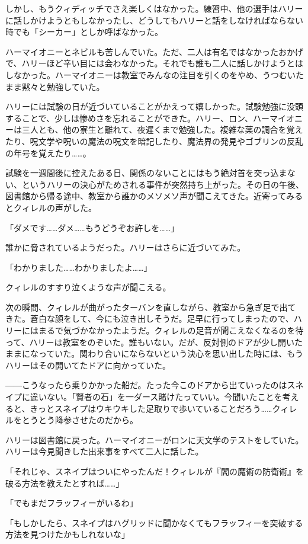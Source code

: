 \documentclass[10pt,a4paper]{article}
\begin{document}
\begin{CJK}{UTF8}{min}
しかし、もうクィディッチでさえ楽しくはなかった。練習中、他の選手はハリーに話しかけようともしなかったし、どうしてもハリーと話をしなければならない時でも「シーカー」としか呼ばなかった。

ハーマイオニーとネビルも苦しんでいた。ただ、二人は有名ではなかったおかげで、ハリーほど辛い目には会わなかった。それでも誰も二人に話しかけようとはしなかった。ハーマイオニーは教室でみんなの注目を引くのをやめ、うつむいたまま黙々と勉強していた。

ハリーには試験の日が近づいていることがかえって嬉しかった。試験勉強に没頭することで、少しは惨めさを忘れることができた。ハリー、ロン、ハーマイオニーは三人とも、他の寮生と離れて、夜遅くまで勉強した。複雑な薬の調合を覚えたり、呪文学や呪いの魔法の呪文を暗記したり、魔法界の発見やゴブリンの反乱の年号を覚えたり……。

試験を一週間後に控えたある日、関係のないことにはもう絶対首を突っ込まない、というハリーの決心がためされる事件が突然持ち上がった。その日の午後、図書館から帰る途中、教室から誰かのメソメソ声が聞こえてきた。近寄ってみるとクィレルの声がした。

「ダメです……ダメ……もうどうぞお許しを……」

誰かに脅されているようだった。ハリーはさらに近づいてみた。

「わかりました……わかりましたよ……」

クィレルのすすり泣くような声が聞こえる。

次の瞬間、クィレルが曲がったターバンを直しながら、教室から急ぎ足で出てきた。蒼白な顔をして、今にも泣き出しそうだ。足早に行ってしまったので、ハリーにはまるで気づかなかったようだ。クィレルの足音が聞こえなくなるのを待って、ハリーは教室をのぞいた。誰もいない。だが、反対側のドアが少し開いたままになっていた。関わり合いにならないという決心を思い出した時には、もうハリーはその開いてたドアに向かっていた。

――こうなったら乗りかかった船だ。たった今このドアから出ていったのはスネイプに違いない。「賢者の石」を一ダース賭けたっていい。今聞いたことを考えると、きっとスネイプはウキウキした足取りで歩いていることだろう……クィレルをとうとう降参させたのだから。

ハリーは図書館に戻った。ハーマイオニーがロンに天文学のテストをしていた。ハリーは今見聞きした出来事をすべて二人に話した。

「それじゃ、スネイプはついにやったんだ！クィレルが『閻の魔術の防衛術』を破る方法を教えたとすれば……」

「でもまだフラッフィーがいるわ」

「もしかしたら、スネイプはハグリッドに聞かなくてもフラッフィーを突破する方法を見つけたかもしれないな」


\end{CJK}
\end{document}
